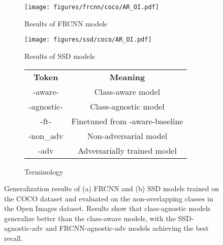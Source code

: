\documentclass[10pt,twocolumn,letterpaper]{article}
\begin{document}
{
\def \fs {0.33} \def \sfs {1} \begin{figure*}
\centering
\begin{subfigure}{\fs\textwidth}
\centering
\texttt{[image: figures/frcnn/coco/AR\_OI.pdf]}
\caption{Results of FRCNN models}
\end{subfigure}
\begin{subfigure}{\fs\textwidth}
\centering
\texttt{[image: figures/ssd/coco/AR\_OI.pdf]}
\caption{Results of SSD models}
\end{subfigure}
\begin{subfigure}{\fs\textwidth}
\scriptsize
\centering
\vspace{-30pt}
\caption*{Terminology}
\setlength{\tabcolsep}{0.9em}
\begin{tabular}{c c}
\toprule
    \textbf{Token} & \textbf{Meaning} \\
    \cmidrule(r){1-1} \cmidrule(l){2-2}
    -aware- & Class-aware model \\
    -agnostic- & Class-agnostic model \\
    -ft- & Finetuned from -aware-baseline \\
    -non\_adv & Non-adversarial model \\
    -adv & Adversarially trained model \\
\bottomrule
\end{tabular}
\end{subfigure}
\caption{Generalization results of (a) FRCNN and (b) SSD models trained on the COCO dataset and evaluated on the non-overlapping classes in the Open Images dataset. Results show that class-agnostic models generalize better than the class-aware models, with the SSD-agnostic-adv and FRCNN-agnostic-adv models achieving the best recall.}
\vspace{-5pt}
\end{figure*}
}
\end{document}
